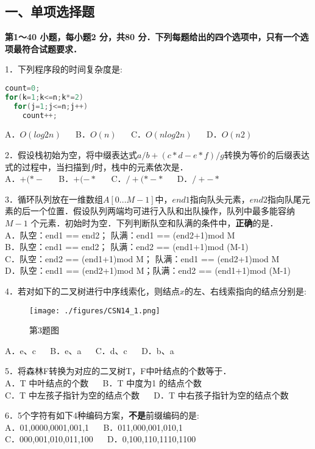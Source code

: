 
\subsection{一、单项选择题}
\textbf{第1～40 小题，每小题2 分，共80 分．下列每题给出的四个选项中，只有一个选项最符合试题要求．}

1．下列程序段的时间复杂度是:
\begin{lstlisting}[language=cpp]
count=0;
for(k=1;k<=n;k*=2)
  for(j=1;j<=n;j++)
    count++;
\end{lstlisting}
A．$O(log2n)$ $\quad$ B．$O(n)$ $\quad$ C．$O(nlog2n)$ $\quad$ D．$O(n2)$

2．假设栈初始为空，将中缀表达式$a/b+(c*d-e*f)/g$转换为等价的后缀表达式的过程中，当扫描到$f$时，栈中的元素依次是． \\
A．$+ ( * -$  $\quad$ B．$+ ( - *$  $\quad$ C．$/ + ( * - *$  $\quad$ D．$/ + - *$

3．循环队列放在一维数组$A[0...M-1]$中，$end1$指向队头元素，$end2$指向队尾元素的后一个位置．假设队列两端均可进行入队和出队操作，队列中最多能容纳$M-1$ 个元素．初始时为空．下列判断队空和队满的条件中，\textbf{正确}的是． \\
A．队空：end1 == end2； 队满：end1 == (end2+1)mod M \\
B．队空：end1 == end2； 队满：end2 == (end1+1)mod (M-1) \\
C．队空：end2 == (end1+1)mod M； 队满：end1 == (end2+1)mod M \\
D．队空：end1 == (end2+1)mod M；队满：end2 == (end1+1)mod (M-1)

4．若对如下的二叉树进行中序线索化，则结点$x$的左、右线索指向的结点分别是:
\begin{figure}[ht]
\centering
\texttt{[image: ./figures/CSN14\_1.png]}
\caption{第3题图} \label{CSN14_fig1}
\end{figure}
A．e、c $\quad$ B．e、a $\quad$ C．d、c $\quad$ D．b、a

5．将森林F转换为对应的二叉树T，F中叶结点的个数等于． \\
A．T 中叶结点的个数 $\quad$ B．T 中度为1 的结点个数 \\
C．T 中左孩子指针为空的结点个数 $\quad$ D．T 中右孩子指针为空的结点个数

6．5个字符有如下4种编码方案，\textbf{不是}前缀编码的是: \\
A．01,0000,0001,001,1 $\quad$ B．011,000,001,010,1 \\
C．000,001,010,011,100 $\quad$ D．0,100,110,1110,1100

